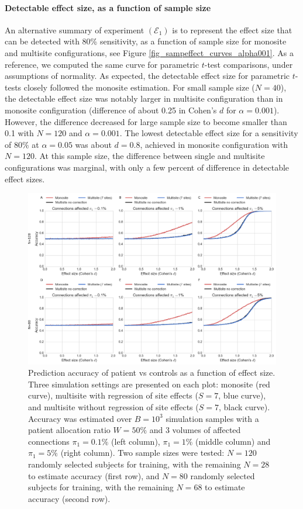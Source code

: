 \documentclass[authoryear]{elsarticle}
\begin{document}
\paragraph{Detectable effect size, as a function of sample size} An alternative summary of experiment $(\mathcal{E}_1)$ is to represent the effect size that can be detected with 80\% sensitivity, as a function of sample size for monosite and multisite configurations, see Figure \ref{fig_sampeffect_curves_alpha001}. As a reference, we computed the same curve for parametric $t$-test comparisons, under assumptions of normality. As expected, the detectable effect size for parametric $t$-tests closely followed the monosite estimation. For small sample size ($N=40$), the detectable effect size was notably larger in multisite configuration than in monosite configuration (difference of about 0.25 in Cohen's $d$ for $\alpha=0.001$). However, the difference decreased for large sample size to become smaller than 0.1 with $N=120$ and $\alpha=0.001$. The lowest detectable effect size for a sensitivity of $80\%$ at $\alpha=0.05$ was about $d=0.8$, achieved in monosite configuration with $N=120$. At this sample size, the difference between single and multisite configurations was marginal, with only a few percent of difference in detectable effect sizes. 



\begin{figure}[htbp]
\centering
\captionsetup[subfloat]{labelformat=empty}
\includegraphics[width=\textwidth]{../figures/prediction_effectsize.png}
\caption[]{
Prediction accuracy of patient vs controls as a function of effect size. Three simulation settings are presented on each plot: monosite (red curve), multisite with regression of site effects ($S=7$, blue curve), and multisite without regression of site effects ($S=7$, black curve). Accuracy was estimated over $B=10^3$ simulation samples with a patient allocation ratio $W=50\%$ and 3 volumes of affected connections $\pi_1=0.1\%$ (left column), $\pi_1=1\%$ (middle column) and $\pi_1=5\%$ (right column). Two sample sizes were tested: $N=120$ randomly selected subjects for training, with the remaining $N=28$ to estimate accuracy (first row), and $N=80$ randomly selected subjects for training, with the remaining $N=68$ to estimate accuracy (second row).
}
\label{fig_prediction_sampeffect}
\end{figure}
\end{document}
